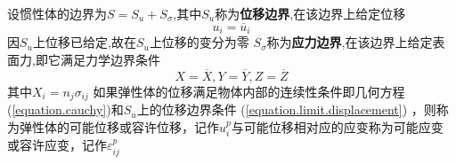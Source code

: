 \documentclass{book}
\begin{document}
设惯性体的边界为$S=S_u+S_{\sigma}$,其中$S_u$称为\textbf{位移边界},在该边界上给定位移
\begin{equation}
u_i=\overline{u}_i
\label{equation.limit.displacement}
\end{equation}
因$S_u$上位移已给定,故在$S_u$上位移的变分为零
$S_\sigma$称为\textbf{应力边界},在该边界上给定表面力,即它满足力学边界条件
\begin{equation}
X=\overline{X},
Y=\overline{Y},
Z=\overline{Z}
\label{equation.limit.contraint}
\end{equation}
其中$X_i=n_j \sigma_{ij}$
如果弹性体的位移满足物体内部的连续性条件即几何方程(\ref{equation.cauchy})和$S_u$上的位移边界条件 (\ref{equation.limit.displacement}) ，则称为弹性体的可能位移或容许位移，记作$u_i^p$与可能位移相对应的应变称为可能应变 或容许应变，记作$\varepsilon_{ij}^p$
\end{document}
